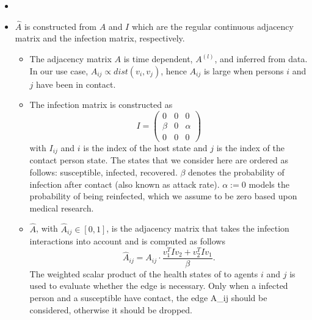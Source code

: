 \documentclass[]{article}
\begin{document}
\begin{itemize}
	\item {} 
	\item $\hat{A}$ is constructed from $A$ and $I$ which are the regular continuous adjacency matrix and the infection matrix, respectively.
	\begin{itemize}
		\item The adjacency matrix $A$ is time dependent, $A^{(l)}$, and inferred from data. In our use case, $A_{ij} \propto dist(v_i, v_j)$, hence $A_{ij}$ is large when persons $i$ and $j$ have been in contact.
		\item The infection matrix is constructed as
		\begin{equation}
			I =
			\begin{pmatrix}
				0     &  0  & 0 \\
				\beta &  0  & \alpha \\
				0     &  0  & 0
			\end{pmatrix}
		\end{equation}
		with $I_{ij}$ and $i$ is the index of the host state and $j$ is the index of the contact person state. The states that we consider here are ordered as follows: susceptible, infected, recovered. $\beta$ denotes the probability of infection  after contact (also known as attack rate). $\alpha := 0$ models the probability of being reinfected, which we assume to be zero based upon medical research.
		\item $\hat{A}$, with $\hat{A}_{ij}\in [0, 1]$, is the adjacency matrix that takes the infection interactions into account and is computed as follows
		\begin{equation}
			\hat{A}_{ij} = A_{ij}\cdot \frac{ v_1^T I v_2 + v_2^T I v_1 }{\beta}.
		\end{equation}
		The weighted scalar product of the health states of to agents $i$ and $j$ is used to evaluate whether the edge is necessary. 
		Only when a infected person and a susceptible have contact, the edge A_{ij} should be considered, otherwise it should be dropped.
		

\end{itemize}
\end{itemize}
\end{document}
